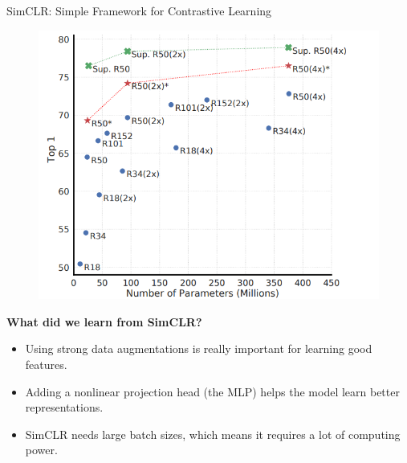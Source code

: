 \begin{frame}[allowframebreaks]{SimCLR: Simple Framework for Contrastive Learning}
\framebreak

\begin{figure}
    \centering
    \includegraphics[width=\linewidth,height=0.9\textheight,keepaspectratio]{images/contrastive/slide_76_1_img.png}
\end{figure}

\framebreak

\textbf{What did we learn from SimCLR?}
\begin{itemize}
    \item Using strong data augmentations is really important for learning good features.
    \item Adding a nonlinear projection head (the MLP) helps the model learn better representations.
    \item SimCLR needs large batch sizes, which means it requires a lot of computing power.
\end{itemize}
\end{frame}



